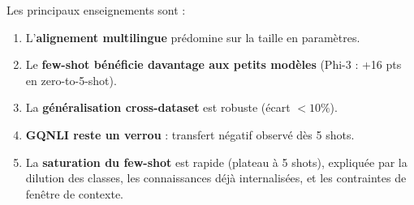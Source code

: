 Les principaux enseignements sont :
\begin{enumerate}
    \item L'\textbf{alignement multilingue} prédomine sur la taille en paramètres.
    \item Le \textbf{few-shot bénéficie davantage aux petits modèles} (Phi-3 : +16 pts en zero-to-5-shot).
    \item La \textbf{généralisation cross-dataset} est robuste (écart $< 10\%$).
    \item \textbf{GQNLI reste un verrou} : transfert négatif observé dès 5 shots.
    \item La \textbf{saturation du few-shot} est rapide (plateau à 5 shots), expliquée par la dilution des classes, les connaissances déjà internalisées, et les contraintes de fenêtre de contexte.
\end{enumerate}
